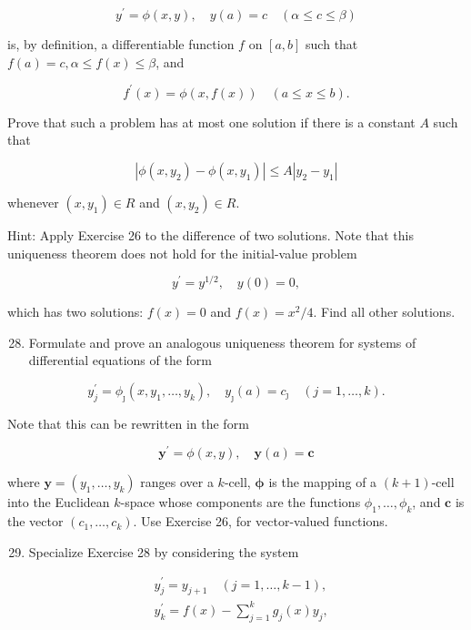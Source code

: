 \documentclass[10pt]{article}
\begin{document}
$$
y^{\prime}=\phi(x, y), \quad y(a)=c \quad(\alpha \leq c \leq \beta)
$$

is, by definition, a differentiable function $f$ on $[a, b]$ such that $f(a)=c, \alpha \leq f(x) \leq \beta$, and

$$
f^{\prime}(x)=\phi(x, f(x)) \quad(a \leq x \leq b) .
$$

Prove that such a problem has at most one solution if there is a constant $A$ such that

$$
\left|\phi\left(x, y_{2}\right)-\phi\left(x, y_{1}\right)\right| \leq A\left|y_{2}-y_{1}\right|
$$

whenever $\left(x, y_{1}\right) \in R$ and $\left(x, y_{2}\right) \in R$.

Hint: Apply Exercise 26 to the difference of two solutions. Note that this uniqueness theorem does not hold for the initial-value problem

$$
y^{\prime}=y^{1 / 2}, \quad y(0)=0,
$$

which has two solutions: $f(x)=0$ and $f(x)=x^{2} / 4$. Find all other solutions.

\begin{enumerate}
  \setcounter{enumi}{27}
  \item Formulate and prove an analogous uniqueness theorem for systems of differential equations of the form
\end{enumerate}

$$
y_{j}^{\prime}=\phi_{\jmath}\left(x, y_{1}, \ldots, y_{k}\right), \quad y_{\jmath}(a)=c_{\jmath} \quad(j=1, \ldots, k) .
$$

Note that this can be rewritten in the form

$$
\mathbf{y}^{\prime}=\phi(x, y), \quad \mathbf{y}(a)=\mathbf{c}
$$

where $\mathbf{y}=\left(y_{1}, \ldots, y_{k}\right)$ ranges over a $k$-cell, $\boldsymbol{\phi}$ is the mapping of a $(k+1)$-cell into the Euclidean $k$-space whose components are the functions $\phi_{1}, \ldots, \phi_{k}$, and $\mathbf{c}$ is the vector $\left(c_{1}, \ldots, c_{k}\right)$. Use Exercise 26, for vector-valued functions.

\begin{enumerate}
  \setcounter{enumi}{28}
  \item Specialize Exercise 28 by considering the system
\end{enumerate}

$$
\begin{aligned}
& y_{j}^{\prime}=y_{j+1} \quad(j=1, \ldots, k-1), \\
& y_{k}^{\prime}=f(x)-\sum_{j=1}^{k} g_{j}(x) y_{j},
\end{aligned}
$$
\end{document}
